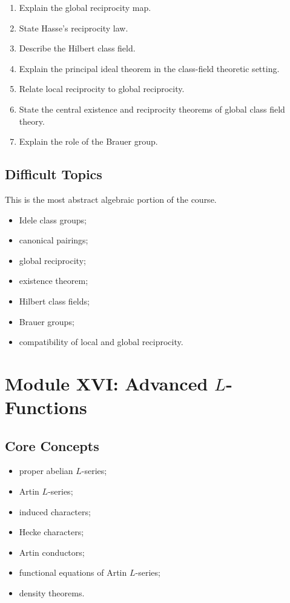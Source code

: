 \documentclass[11pt,a4paper]{article}
\begin{document}
\begin{enumerate}
    \item Explain the global reciprocity map.
    \item State Hasse's reciprocity law.
    \item Describe the Hilbert class field.
    \item Explain the principal ideal theorem in the class-field
    theoretic setting.
    \item Relate local reciprocity to global reciprocity.
    \item State the central existence and reciprocity theorems
    of global class field theory.
    \item Explain the role of the Brauer group.
\end{enumerate}

\subsection{Difficult Topics}

This is the most abstract algebraic portion of the course.

\begin{itemize}
    \item Idele class groups;
    \item canonical pairings;
    \item global reciprocity;
    \item existence theorem;
    \item Hilbert class fields;
    \item Brauer groups;
    \item compatibility of local and global reciprocity.
\end{itemize}

\section{Module XVI: Advanced \(L\)-Functions}

\subsection{Core Concepts}

\begin{itemize}
    \item proper abelian \(L\)-series;
    \item Artin \(L\)-series;
    \item induced characters;
    \item Hecke characters;
    \item Artin conductors;
    \item functional equations of Artin \(L\)-series;
    \item density theorems.
\end{itemize}
\end{document}
